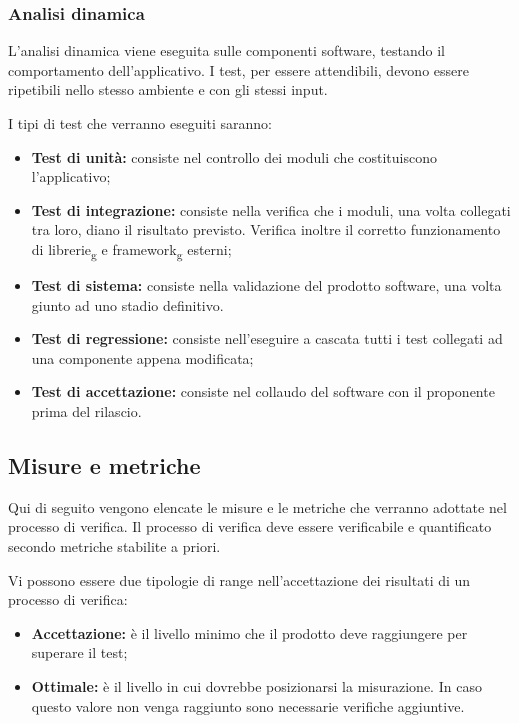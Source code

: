\documentclass[12pt,a4paper,titlepage]{article}
\begin{document}
		\subsubsection{Analisi dinamica}
		L'analisi dinamica viene eseguita sulle componenti software, testando il comportamento dell'applicativo. I test, per essere attendibili, devono essere ripetibili nello stesso ambiente e con gli stessi input.
		
		I tipi di test che verranno eseguiti saranno:
		\begin{itemize}
			\item \textbf{Test di unità:} consiste nel controllo dei moduli che costituiscono l'applicativo;
			\item \textbf{Test di integrazione:} consiste nella verifica che i moduli, una volta collegati tra loro, diano il risultato previsto. Verifica inoltre il corretto funzionamento di librerie\textsubscript{g} e framework\textsubscript{g} esterni;
			\item \textbf{Test di sistema:} consiste nella validazione del prodotto software, una volta giunto ad uno stadio definitivo.
			\item \textbf{Test di regressione:} consiste nell'eseguire a cascata tutti i test collegati ad una componente appena modificata;
			\item \textbf{Test di accettazione:} consiste nel collaudo del software con il proponente prima del rilascio.
			
		\end{itemize}
	\subsection{Misure e metriche}
	\label{MisureMetriche}
	Qui di seguito vengono elencate le misure e le metriche che verranno adottate nel processo di verifica. Il processo di verifica deve essere verificabile e quantificato secondo metriche stabilite a priori.
	
	Vi possono essere due tipologie di range nell'accettazione dei risultati di un processo di verifica:
	\begin{itemize}
		\item \textbf{Accettazione:} è il livello minimo che il prodotto deve raggiungere per superare il test;
		\item \textbf{Ottimale:} è il livello in cui dovrebbe posizionarsi la misurazione. In caso questo valore non venga raggiunto sono necessarie verifiche aggiuntive.
	\end{itemize}
\end{document}
